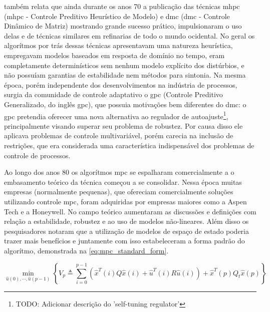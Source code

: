  também relata que ainda durante os anos 70 a publicação das técnicas
\acrlong{mhpc} (\acrshort{mhpc} - Controle Preditivo Heurístico de Modelo) e
\acrlong{dmc} (\acrshort{dmc} - Controle Dinâmico de Matriz) mostrando grande sucesso prático,
impulsionaram o uso delas e de técnicas similares em refinarias de todo o mundo ocidental.
No geral os algorítmos por trás dessas técnicas apresentavam uma natureza heurística,
empregavam modelos baseados em resposta de domínio no tempo, eram completamente determinísticos
sem nenhum modelo explícito dos distúrbios, e não possuíam garantias de estabilidade nem
métodos para sintonia. Na mesma época, porém independente dos desenvolvimentos na indústria
de processos, surgia da comunidade de controle adaptativo o \acrshort{gpc} (Controle Preditivo
Generalizado, do inglês \acrlong{gpc}), que possuia motivações bem diferentes do \acrshort{dmc}:
o \acrshort{gpc} pretendia oferecer uma nova alternativa ao regulador de autoajuste\footnote{
    TODO: Adicionar descrição do 'self-tuning regulator'    %
}, 
principalmente visando superar seu problema de robustez. Por causa disso ele aplicava problemas de controle
multivariável, porém carecia na inclusão de restrições, que era considerada uma característica
indispensável dos problemas de controle de processos.

Ao longo dos anos 80 os algorítmos \acrshort{mpc} se espalharam comercialmente a o embasamento
teórico da técnica começou a se consolidar. Nessa época muitas empresas (normalmente pequenas),
que ofereciam comercialmente soluções utilizando controle \acrshort{mpc}, foram adquiridas por
empresas maiores como a Aspen Tech e a Honeywell. No campo teórico aumentaram as discussões e
definições com relação a estabilidade, robustez e ao uso de modelos não-lineares. Além disso
os pesquisadores notaram que a utilização de modelos de espaço de estado poderia trazer mais
benefícios e juntamente com isso estabeleceram a forma padrão do algorítmo, demonstrada na
\cref{eq:mpc_standard_form}. \cite{Lee2011} 

\begin{equation}
	\label{eq:mpc_standard_form}
    \min_{\hat{u}(0),\cdots,\hat{u}(p-1)}
    \left\{
        V_p \triangleq \displaystyle\sum_{i=0}^{p-1}
            \left(\hat{x}^T(i)Q\hat{x}(i) + \hat{u}^T(i)R\hat{u}(i) \right)
            + \hat{x}^T(p)Q_t\hat{x}(p)
    \right\}
\end{equation}
\newline

